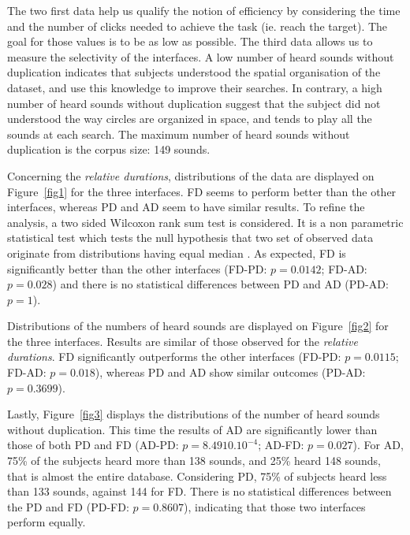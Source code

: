 \documentclass{aes2e}
\begin{document}
The two first data help us qualify the notion of efficiency by considering the time and the number of clicks needed to achieve the task (ie. reach the target). The goal for those values is to be as low as possible. The third data allows us to measure the selectivity of the interfaces. A low number of heard sounds without duplication indicates that subjects understood the spatial organisation of the dataset, and use this knowledge to improve their searches. In contrary, a high number of heard sounds without duplication suggest that the subject did not understood the way circles are organized in space, and tends to play all the sounds at each search. The maximum number of heard sounds without duplication is the corpus size: 149 sounds.


Concerning the \textit{relative durations}, distributions of the data are displayed on Figure~\ref{fig1} for the three interfaces. FD seems to  perform better  than the other interfaces, whereas PD and AD seem to have similar results. To refine the analysis, a two sided Wilcoxon rank sum test is considered. It is a non parametric statistical test which tests the null hypothesis that two set of observed data originate from distributions having equal median \cite{gibbons2011nonparametric}. As expected, FD is significantly better than the other interfaces (FD-PD: $p=0.0142$; FD-AD: $p=0.028$) and there is no statistical differences between PD and AD (PD-AD: $p=1$). 

Distributions of  the numbers of heard sounds are displayed on Figure~\ref{fig2} for the three interfaces. Results are similar of those observed for the \textit{relative durations}. FD significantly outperforms the other interfaces (FD-PD: $p=0.0115$; FD-AD: $p=0.018$), whereas PD and AD show similar outcomes (PD-AD: $p=0.3699$).

Lastly, Figure~\ref{fig3} displays the distributions of the number of heard sounds without duplication. This time the results of AD are significantly lower than those of both PD and FD (AD-PD: $p=8.4910.10^{-4}$; AD-FD: $p=0.027$).  For AD, 75\% of the subjects heard more than 138 sounds, and 25\% heard 148 sounds, that is almost the entire database. Considering PD, 75\% of subjects heard  less than 133 sounds, against 144 for FD. There is no statistical differences between the PD and FD (PD-FD: $p=0.8607$), indicating that those two interfaces perform equally.
\end{document}
